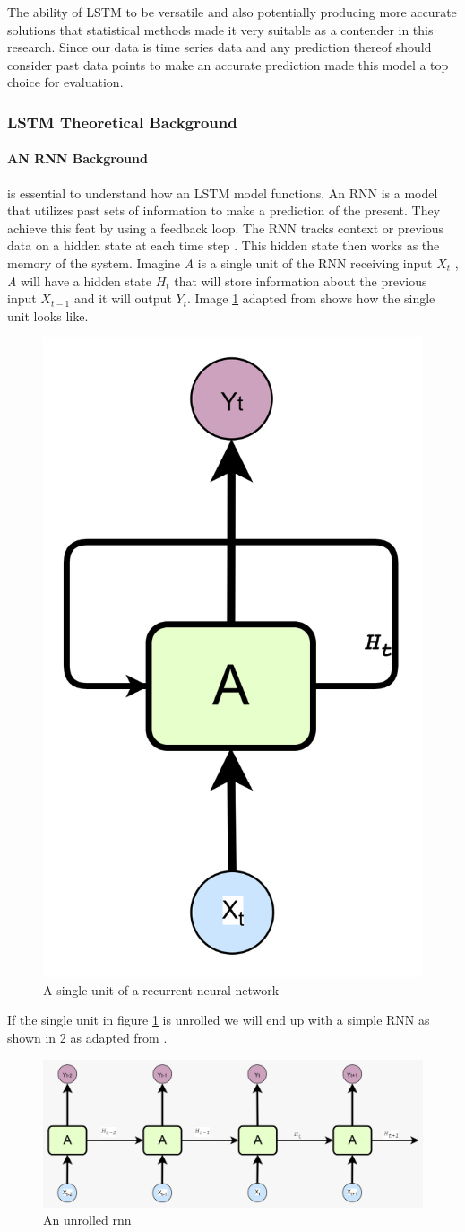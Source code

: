  The ability of LSTM to be versatile and also potentially producing more accurate solutions that statistical methods made it very suitable as a contender in this research. Since our data is time series data and any prediction thereof should consider past data points to make an accurate prediction made this model a top choice for evaluation.
 
\subsubsection{LSTM Theoretical Background}
 
\paragraph{AN RNN Background} is essential to understand how an LSTM model functions. An RNN is a model that utilizes past sets of information to make a prediction of the present. They achieve this feat by using a feedback loop. The RNN tracks context or previous data on a hidden state at each time step \cite{stryker_ibm_rnn}. This hidden state then works as the memory of the system. 
Imagine \textit{A} is a single unit of the RNN receiving input \textit{$X_t$} , \textit{A} will have a  hidden state \textit{$H_t$} that will store information about the previous input $X_{t-1}$ and it will output \textit{$Y_t$}. Image \ref{fig:rnnsingleunit} adapted from \cite{colah2015understanding} shows how the single unit looks like.

\begin{figure}[h]
	\centering
	\includegraphics[width=0.1\linewidth]{Chapters/images/rnn_singleunit}
	\caption{A single unit of a recurrent neural network}
	\label{fig:rnnsingleunit}
\end{figure}
If the single unit in figure \ref{fig:rnnsingleunit} is unrolled we will end up with a simple RNN as shown in \ref{fig:unrolledrnn} as adapted from \cite{colah2015understanding}.


\begin{figure}[h]
	\centering
	\includegraphics[width=0.8\linewidth]{Chapters/images/unrolled_rnn.jpeg}
	\caption{An unrolled rnn}
	\label{fig:unrolledrnn}
\end{figure}

